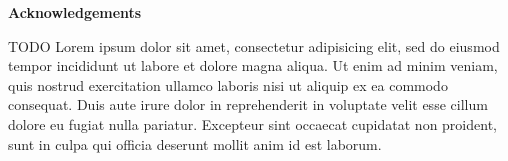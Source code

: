 
\vspace*{\fill}
\begin{center}
\textbf{Acknowledgements}
\end{center}
{\color{red}TODO}
Lorem ipsum dolor sit amet, consectetur adipisicing elit, sed do eiusmod tempor incididunt ut labore et dolore magna aliqua. Ut enim ad minim veniam, quis nostrud exercitation ullamco laboris nisi ut aliquip ex ea commodo consequat. Duis aute irure dolor in reprehenderit in voluptate velit esse cillum dolore eu fugiat nulla pariatur. Excepteur sint occaecat cupidatat non proident, sunt in culpa qui officia deserunt mollit anim id est laborum.
\vspace*{\fill}

